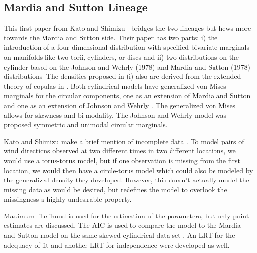 \subsection{Mardia and Sutton Lineage}\label{mod_MS}
This first paper from Kato and Shimizu \cite{kato_dependent_2008}, bridges the two lineages but hews more towards the Mardia and Sutton side. Their paper has two parts: i) the introduction of a four-dimensional distribution with specified bivariate marginals on manifolds like two torii, cylinders, or discs and ii) two distributions on the cylinder based on the Johnson and Wehrly (1978) and Mardia and Sutton (1978) distributions. The densities proposed in (i) also are derived from the extended theory of copulas in \cite{carnicero_non-parametric_2013}\cite{fernandez-duran_models_2007}\cite{garcia-portugues_exploring_2013}. Both cylindrical models have generalized von Mises marginals for the circular components, one as an extension of Mardia and Sutton \cite{mardia_model_1978} and one as an extension of Johnson and Wehrly \cite{johnson_angular-linear_1978}. The generalized von Mises allows for skewness and bi-modality. The Johnson and Wehrly model \cite{johnson_angular-linear_1978} was proposed symmetric and unimodal circular marginals. 

Kato and Shimizu make a brief mention of incomplete data \cite{kato_dependent_2008}. To model pairs of wind directions observed at two different times in two different locations, we would use a torus-torus model, but if one observation is missing from the first location, we would then have a circle-torus model which could also be modeled by the generalized density they developed. However, this doesn't actually model the missing data as would be desired, but redefines the model to overlook the missingness a highly undesirable property.

Maximum likelihood is used for the estimation of the parameters, but only point estimates are discussed. The AIC is used to compare the model to the Mardia and Sutton model on the same skewed cylindrical data set \cite{kato_dependent_2008}. An LRT for the adequacy of fit and another LRT for independence were developed as well.


